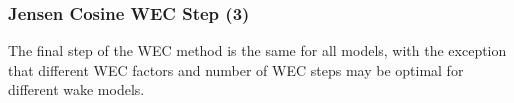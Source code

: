 \documentclass{jpconf}
\begin{document}
\subsubsection{Jensen Cosine WEC Step (3)}

The final step of the WEC method is the same for all models, with the exception that different WEC factors and number of WEC steps may be optimal for different wake models.

%
%
\end{document}
